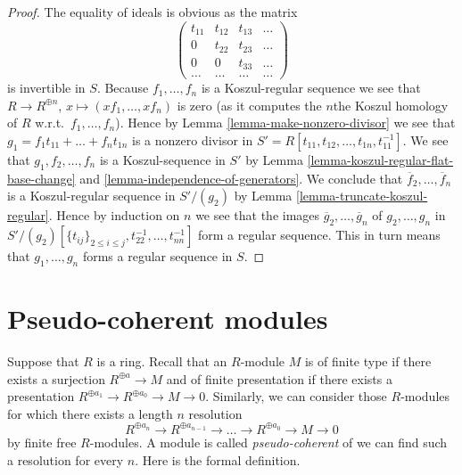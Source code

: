 \begin{proof}
The equality of ideals is obvious as the matrix
$$
\left(
\begin{matrix}
t_{11} & t_{12} & t_{13} & \ldots \\
0 & t_{22} & t_{23} & \ldots \\
0 & 0 & t_{33} & \ldots \\
\ldots & \ldots & \ldots & \ldots
\end{matrix}
\right)
$$
is invertible in $S$.
Because $f_1, \ldots, f_n$ is a Koszul-regular sequence we see that
$R \to R^{\oplus n}$, $x \mapsto (xf_1, \ldots, xf_n)$ is zero (as it
computes the $n$the Koszul homology of $R$ w.r.t.\ $f_1, \ldots, f_n$).
Hence by
Lemma \ref{lemma-make-nonzero-divisor}
we see that $g_1 = f_1 t_{11} + \ldots + f_n t_{1n}$ is a nonzero divisor 
in $S' = R[t_{11}, t_{12}, \ldots, t_{1n}, t_{11}^{-1}]$. We see that
$g_1, f_2, \ldots, f_n$ is a Koszul-sequence in $S'$ by
Lemma \ref{lemma-koszul-regular-flat-base-change} and
\ref{lemma-independence-of-generators}.
We conclude that
$\overline{f}_2, \ldots, \overline{f}_n$ is a Koszul-regular sequence
in $S'/(g_2)$ by
Lemma \ref{lemma-truncate-koszul-regular}.
Hence by induction on $n$ we see that the images
$\overline{g}_2, \ldots, \overline{g}_n$ of $g_2, \ldots, g_n$ in
$S'/(g_2)[\{t_{ij}\}_{2 \leq i \leq j}, t_{22}^{-1}, \ldots, t_{nn}^{-1}]$
form a regular sequence. This in turn means that
$g_1, \ldots, g_n$ forms a regular sequence in $S$.
\end{proof}











\section{Pseudo-coherent modules}
\label{section-pseudo-coherent}

\noindent
Suppose that $R$ is a ring. Recall that an $R$-module $M$ is of finite type
if there exists a surjection $R^{\oplus a} \to M$ and of finite presentation
if there exists a presentation
$R^{\oplus a_1} \to R^{\oplus a_0} \to M \to 0$.
Similarly, we can consider those $R$-modules for which there exists
a length $n$ resolution
\begin{equation}
\label{equation-pseudo-coherent}
R^{\oplus a_n} \to R^{\oplus a_{n - 1}} \to \ldots \to R^{\oplus a_0} \to
M \to 0
\end{equation}
by finite free $R$-modules. A module is called {\it pseudo-coherent}
of we can find such a resolution for every $n$. Here is the formal
definition.


